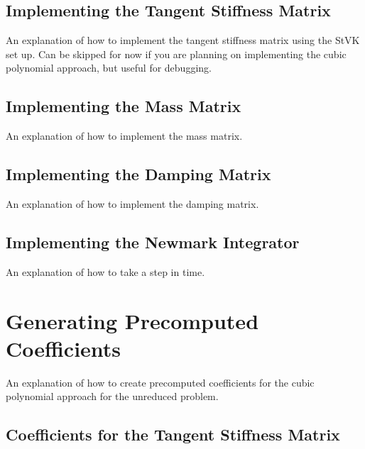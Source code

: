 \documentclass[twocolumn,10pt]{asme2ej}
\begin{document}
\subsection{Implementing the Tangent Stiffness Matrix}

An explanation of how to implement the tangent stiffness matrix using the StVK set up. Can be skipped for now if you are
planning on implementing the cubic polynomial approach, but useful for debugging.

\subsection{Implementing the Mass Matrix}

An explanation of how to implement the mass matrix.

\subsection{Implementing the Damping Matrix}

An explanation of how to implement the damping matrix.

\subsection{Implementing the Newmark Integrator}

An explanation of how to take a step in time.

\section{Generating Precomputed Coefficients}

An explanation of how to create precomputed coefficients for the cubic polynomial approach for the unreduced problem.

\subsection{Coefficients for the Tangent Stiffness Matrix}
\end{document}
